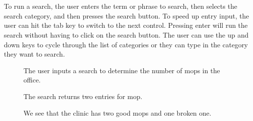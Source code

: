 \documentclass[12pt]{report}
\begin{document}
\chapter*{}

To run a search, the user enters the term or phrase to search, then selects the search category, and then presses the search button.  To speed up entry input, the user can hit the tab key to switch to the next control.  Pressing enter will run the search without having to click on the search button.  The user can use the up and down keys to cycle through the list of categories or they can type in the category they want to search.

\begin{figure}[h!]
\caption{The user inputs a search to determine the number of mops in the office.}
\end{figure}

\begin{figure}[h!]
\caption{The search returns two entries for mop.}
\end{figure}

\begin{figure}[h!]
\caption{We see that the clinic has two good mops and one broken one.}
\end{figure}
\end{document}
